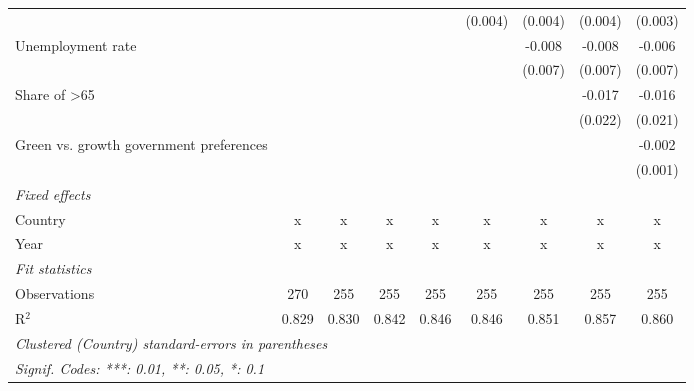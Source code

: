 \begin{table}[htbp]
\begin{tabular}{lcccccccc}
                                                                  &         &         &         &              & (0.004)      & (0.004)      & (0.004)       & (0.003)\\   
      Unemployment rate                                           &         &         &         &              &              & -0.008       & -0.008        & -0.006\\   
                                                                  &         &         &         &              &              & (0.007)      & (0.007)       & (0.007)\\   
      Share of >65                                                &         &         &         &              &              &              & -0.017        & -0.016\\   
                                                                  &         &         &         &              &              &              & (0.022)       & (0.021)\\   
      Green vs. growth government preferences                     &         &         &         &              &              &              &               & -0.002\\   
                                                                  &         &         &         &              &              &              &               & (0.001)\\   
      \emph{Fixed effects}\\
      Country                                                     & x       & x       & x       & x            & x            & x            & x             & x\\  
      Year                                                        & x       & x       & x       & x            & x            & x            & x             & x\\  
      \midrule \emph{Fit statistics}\\
      Observations                                                & 270     & 255     & 255     & 255          & 255          & 255          & 255           & 255\\  
      R$^2$                                                       & 0.829   & 0.830   & 0.842   & 0.846        & 0.846        & 0.851        & 0.857         & 0.860\\  
      \midrule
      \multicolumn{9}{l}{\emph{Clustered (Country) standard-errors in parentheses}}\\
      \multicolumn{9}{l}{\emph{Signif. Codes: ***: 0.01, **: 0.05, *: 0.1}}\\
   \end{tabular}
\end{table}


